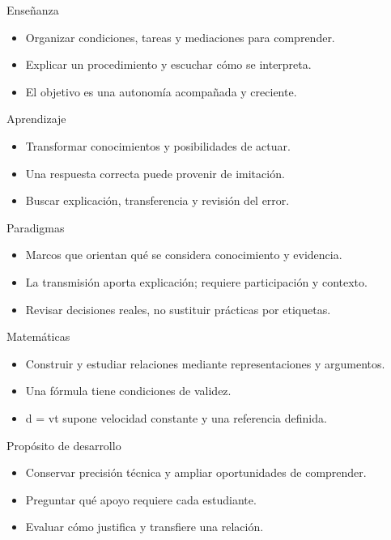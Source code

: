 \documentclass[
	spanish,
	aspectratio=1610,
	xcolor={dvipsnames,table}
]{beamer}
\begin{document}
\begin{frame}{Enseñanza}
\fontsize{14}{18}\selectfont\begin{itemize}\setlength{\itemsep}{.45cm}
\item Organizar condiciones, tareas y mediaciones para comprender.
\item Explicar un procedimiento y escuchar cómo se interpreta.
\item El objetivo es una autonomía acompañada y creciente.
\end{itemize}
\end{frame}
\begin{frame}{Aprendizaje}
\fontsize{14}{18}\selectfont\begin{itemize}\setlength{\itemsep}{.45cm}
\item Transformar conocimientos y posibilidades de actuar.
\item Una respuesta correcta puede provenir de imitación.
\item Buscar explicación, transferencia y revisión del error.
\end{itemize}
\end{frame}
\begin{frame}{Paradigmas}
\fontsize{14}{18}\selectfont\begin{itemize}\setlength{\itemsep}{.45cm}
\item Marcos que orientan qué se considera conocimiento y evidencia.
\item La transmisión aporta explicación; requiere participación y contexto.
\item Revisar decisiones reales, no sustituir prácticas por etiquetas.
\end{itemize}
\end{frame}
\begin{frame}{Matemáticas}
\fontsize{14}{18}\selectfont\begin{itemize}\setlength{\itemsep}{.45cm}
\item Construir y estudiar relaciones mediante representaciones y argumentos.
\item Una fórmula tiene condiciones de validez.
\item d = vt supone velocidad constante y una referencia definida.
\end{itemize}
\end{frame}
\begin{frame}{Propósito de desarrollo}
\fontsize{14}{18}\selectfont\begin{itemize}\setlength{\itemsep}{.45cm}
\item Conservar precisión técnica y ampliar oportunidades de comprender.
\item Preguntar qué apoyo requiere cada estudiante.
\item Evaluar cómo justifica y transfiere una relación.
\end{itemize}
\end{frame}
\end{document}
